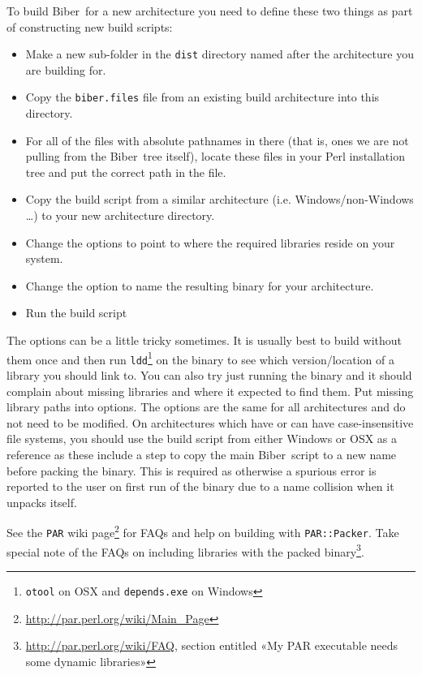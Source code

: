 \documentclass{ltxdockit}
\newcommand*{\biber}{Biber\xspace}
\begin{document}
\noindent To build \biber\ for a new architecture you need to
define these two things as part of constructing new build scripts:

\begin{itemize}
\item Make a new sub-folder in the \verb+dist+ directory named after the
  architecture you are building for.
\item Copy the \verb+biber.files+ file from an existing build
  architecture into this directory.
\item For all of the files with absolute pathnames in there (that is,
  ones we are not pulling from the \biber\ tree itself), locate these
  files in your Perl installation tree and put the correct path in the
  file.
\item Copy the build script from a similar architecture
  (i.e. Windows/non-Windows \ldots) to your new architecture
  directory. 
\item Change the  options to point to where the required
  libraries reside on your system.
\item Change the  option to name the resulting binary
  for your architecture.
\item Run the build script
\end{itemize}

\noindent The  options can be a little tricky sometimes. It is
usually best to build without them once and then run
\verb+ldd+\footnote{\texttt{otool} on OSX and \texttt{depends.exe} on Windows}
on the binary to see which version/location of a library you should link
to. You can also try just running the binary and it should complain about
missing libraries and where it expected to find them. Put missing library
paths into  options. The  options are the same
for all architectures and do not need to be modified. On architectures
which have or can have case-insensitive file systems, you should use the
build script from either Windows or OSX as a reference as these include a
step to copy the main \biber\ script to a new name before packing the
binary. This is required as otherwise a spurious error is reported to the
user on first run of the binary due to a name collision when it unpacks
itself.

See the \verb+PAR+ wiki
page\footnote{\url{http://par.perl.org/wiki/Main_Page}} for FAQs and help
on building with \verb+PAR::Packer+. Take special note of the FAQs on
including libraries with the packed
binary\footnote{\url{http://par.perl.org/wiki/FAQ}, section entitled «My
  PAR executable needs some dynamic libraries»}.
\end{document}
